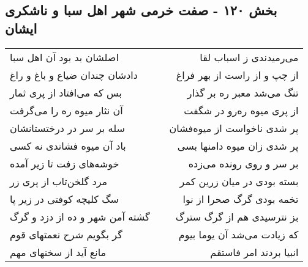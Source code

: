 \begin{center}
\section*{بخش ۱۲۰ - صفت خرمی شهر اهل سبا و ناشکری ایشان}
\label{sec:sh120}
\begin{longtable}{l p{0.5cm} r}
اصلشان بد بود آن اهل سبا
&&
می‌رمیدندی ز اسباب لقا
\\
دادشان چندان ضیاع و باغ و راغ
&&
از چپ و از راست از بهر فراغ
\\
بس که می‌افتاد از پری ثمار
&&
تنگ می‌شد معبر ره بر گذار
\\
آن نثار میوه ره را می‌گرفت
&&
از پری میوه ره‌رو در شگفت
\\
سله بر سر در درختستانشان
&&
پر شدی ناخواست از میوه‌فشان
\\
باد آن میوه فشاندی نه کسی
&&
پر شدی زان میوه دامنها بسی
\\
خوشه‌های زفت تا زیر آمده
&&
بر سر و روی رونده می‌زده
\\
مرد گلخن‌تاب از پری زر
&&
بسته بودی در میان زرین کمر
\\
سگ کلیچه کوفتی در زیر پا
&&
تخمه بودی گرگ صحرا از نوا
\\
گشته آمن شهر و ده از دزد و گرگ
&&
بز نترسیدی هم از گرگ سترگ
\\
گر بگویم شرح نعمتهای قوم
&&
که زیادت می‌شد آن یوما بیوم
\\
مانع آید از سخنهای مهم
&&
انبیا بردند امر فاستقم
\\
\end{longtable}
\end{center}
